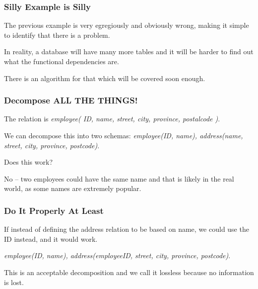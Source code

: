 \begin{frame}
\frametitle{Silly Example is Silly}

The previous example is very egregiously and obviously wrong, making it simple to identify that there is a problem. 

In reality, a database will have many more tables and it will be harder to find out what the functional dependencies are. 

There is an algorithm for that which will be covered soon enough.
\end{frame}



\begin{frame}
\frametitle{Decompose ALL THE THINGS!}

The relation is \textit{employee( ID, name, street, city, province, postalcode )}.

We can decompose this into two schemas: \textit{employee(ID, name), address(name, street, city, province, postcode)}. 

Does this work? 

No -- two employees could have the same name and that is likely in the real world, as some names are extremely popular. 

\end{frame}



\begin{frame}
\frametitle{Do It Properly At Least}

If instead of defining the address relation to be based on name, we could use the ID instead, and it would work. 

\textit{employee(ID, name), address(employeeID, street, city, province, postcode)}. 

This is an acceptable decomposition and we call it \alert{lossless} because no information is lost. 

\end{frame}


